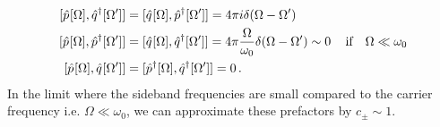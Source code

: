 \begin{equation*}
  \begin{split}
[\hat{p}^{\vphantom{\dagger}}[\Omega], \hat{q}^\dagger[\Omega']] & = [\hat{q}^{\vphantom{\dagger}}[\Omega], \hat{p}^\dagger[\Omega']] = 4 \pi i  \delta(\Omega - \Omega') \, \\ 
[\hat{p}^{\vphantom{\dagger}}[\Omega], \hat{p}^\dagger[\Omega']] & = [\hat{q}^{\vphantom{\dagger}}[\Omega], \hat{q}^\dagger[\Omega']] = 4 \pi  \dfrac{\Omega}{\omega_0}\delta(\Omega - \Omega') \sim 0 \,\quad \text{if} \quad  \Omega \ll \omega_0  \\
[\hat{p}^{\vphantom{\dagger}}[\Omega], \hat{q}^{\vphantom{\dagger}}[\Omega']] & = [\hat{p}^\dagger[\Omega], \hat{q}^\dagger[\Omega']] = 0 \,.
  \end{split}
\end{equation*}
In the limit where the sideband frequencies are small compared to the carrier frequency i.e. $\Omega \ll \omega_0$, we can approximate these prefactors by $c_\pm \sim 1$. 
